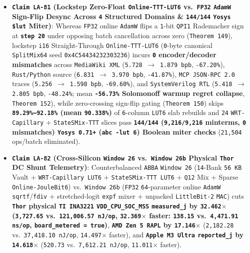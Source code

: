\documentclass[10pt]{article}
\begin{document}
\begin{itemize}
\textbf{\texttt{100.00\%} bit-identical \texttt{archive\_sha256 = 5342cc0b24a603b0...} across all \texttt{3} CPU architectures} (\texttt{0} raw \texttt{enwik8} files persisted).
  \item \textbf{\texttt{Claim LA-81} (Lockstep Zero-Float \texttt{Online-TTT-LUT6} vs.\ \texttt{FP32} \texttt{AdamW} Sign-Flip Desync Across \texttt{4} Structured Domains \& \texttt{144/144} \texttt{Yosys} \texttt{\$lut} Miter)}: Whereas \texttt{FP32} online \texttt{AdamW} flips a \texttt{1}-bit \texttt{QPI1} Rademacher sign at \textbf{\texttt{step 20}} under opposing batch cancellation across zero (\texttt{Theorem 149}), lockstep \texttt{i16} Straight-Through \texttt{Online-TTT-LUT6} (\texttt{0}-byte canonical \texttt{SplitMix64} seed \texttt{0x4C54434232303236}) incurs \textbf{\texttt{0} encoder/decoder mismatches} across \texttt{MediaWiki XML} (\texttt{5.728 $\to$ 1.879 bpb}, \texttt{-67.20\%}), \texttt{Rust/Python} source (\texttt{6.831 $\to$ 3.970 bpb}, \texttt{-41.87\%}), \texttt{MCP JSON-RPC 2.0} traces (\texttt{5.256 $\to$ 1.598 bpb}, \texttt{-69.60\%}), and \texttt{SystemVerilog RTL} (\texttt{5.418 $\to$ 2.805 bpb}, \texttt{-48.24\%}; mean \textbf{\texttt{-56.73\%} Solomonoff warmup regret collapse}, \texttt{Theorem 152}), while zero-crossing sign-flip gating (\texttt{Theorem 150}) skips \textbf{\texttt{89.29\%--92.18\%} (mean \texttt{90.338\%})} of \texttt{6}-column \texttt{LUT6} slab rebuilds and \texttt{24} \texttt{WRT-Capillary} + \texttt{StateSMix-TTT} slices pass \textbf{\texttt{144/144} (\texttt{9,216/9,216} minterms, \texttt{0} mismatches) \texttt{Yosys 0.71+} (\texttt{abc -lut 6}) Boolean miter checks} (\texttt{21,504} ops/batch eliminated).
  \item \textbf{\texttt{Claim LA-82} (Cross-Silicon \texttt{Window 26} vs.\ \texttt{Window 26b} Physical \texttt{Thor} DC Shunt Telemetry)}: Counterbalanced \texttt{ABBA} \texttt{Window 26} (\texttt{14}-Bank \texttt{56 KB} Vault + \texttt{WRT-Capillary LUT6} + \texttt{StateSMix-TTT LUT6} + \texttt{Q12} Mix + Sparse \texttt{Online-JouleBit6}) vs.\ \texttt{Window 26b} (\texttt{FP32} \texttt{64}-parameter online \texttt{AdamW} \texttt{sqrtf}/\texttt{fdiv} + stretched-logit \texttt{expf} mixer + unpacked \texttt{LittleBit-2} \texttt{MAC}) cuts \textbf{\texttt{Thor} physical \texttt{TI INA3221} \texttt{VDD\_CPU\_SOC\_MSS} \texttt{measured\_j} by \texttt{32.462$\times$} (\texttt{3,727.65} vs.\ \texttt{121,006.57 nJ/op}, \texttt{32.369$\times$} faster: \texttt{138.15} vs.\ \texttt{4,471.91 ns/op}, \texttt{board\_metered = true})}, \textbf{\texttt{AMD Zen 5 RAPL} by \texttt{17.146$\times$}} (\texttt{2,182.28} vs.\ \texttt{37,418.10 nJ/op}, \texttt{14.497$\times$} faster), and \textbf{\texttt{Apple M3 Ultra} \texttt{reported\_j} by \texttt{14.618$\times$}} (\texttt{520.73} vs.\ \texttt{7,612.21 nJ/op}, \texttt{11.011$\times$} faster).

\end{itemize}
\end{document}
